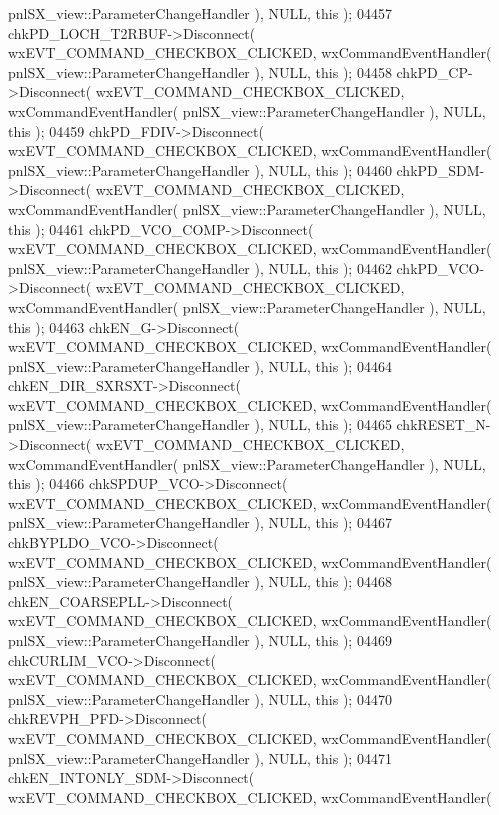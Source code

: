 \begin{DoxyCode}
      pnlSX_view::ParameterChangeHandler ), NULL, \textcolor{keyword}{this} );
04457     chkPD_LOCH_T2RBUF->Disconnect( wxEVT\_COMMAND\_CHECKBOX\_CLICKED, wxCommandEventHandler( 
      pnlSX_view::ParameterChangeHandler ), NULL, \textcolor{keyword}{this} );
04458     chkPD_CP->Disconnect( wxEVT\_COMMAND\_CHECKBOX\_CLICKED, wxCommandEventHandler( 
      pnlSX_view::ParameterChangeHandler ), NULL, \textcolor{keyword}{this} );
04459     chkPD_FDIV->Disconnect( wxEVT\_COMMAND\_CHECKBOX\_CLICKED, wxCommandEventHandler( 
      pnlSX_view::ParameterChangeHandler ), NULL, \textcolor{keyword}{this} );
04460     chkPD_SDM->Disconnect( wxEVT\_COMMAND\_CHECKBOX\_CLICKED, wxCommandEventHandler( 
      pnlSX_view::ParameterChangeHandler ), NULL, \textcolor{keyword}{this} );
04461     chkPD_VCO_COMP->Disconnect( wxEVT\_COMMAND\_CHECKBOX\_CLICKED, wxCommandEventHandler( 
      pnlSX_view::ParameterChangeHandler ), NULL, \textcolor{keyword}{this} );
04462     chkPD_VCO->Disconnect( wxEVT\_COMMAND\_CHECKBOX\_CLICKED, wxCommandEventHandler( 
      pnlSX_view::ParameterChangeHandler ), NULL, \textcolor{keyword}{this} );
04463     chkEN_G->Disconnect( wxEVT\_COMMAND\_CHECKBOX\_CLICKED, wxCommandEventHandler( 
      pnlSX_view::ParameterChangeHandler ), NULL, \textcolor{keyword}{this} );
04464     chkEN_DIR_SXRSXT->Disconnect( wxEVT\_COMMAND\_CHECKBOX\_CLICKED, wxCommandEventHandler( 
      pnlSX_view::ParameterChangeHandler ), NULL, \textcolor{keyword}{this} );
04465     chkRESET_N->Disconnect( wxEVT\_COMMAND\_CHECKBOX\_CLICKED, wxCommandEventHandler( 
      pnlSX_view::ParameterChangeHandler ), NULL, \textcolor{keyword}{this} );
04466     chkSPDUP_VCO->Disconnect( wxEVT\_COMMAND\_CHECKBOX\_CLICKED, wxCommandEventHandler( 
      pnlSX_view::ParameterChangeHandler ), NULL, \textcolor{keyword}{this} );
04467     chkBYPLDO_VCO->Disconnect( wxEVT\_COMMAND\_CHECKBOX\_CLICKED, wxCommandEventHandler( 
      pnlSX_view::ParameterChangeHandler ), NULL, \textcolor{keyword}{this} );
04468     chkEN_COARSEPLL->Disconnect( wxEVT\_COMMAND\_CHECKBOX\_CLICKED, wxCommandEventHandler( 
      pnlSX_view::ParameterChangeHandler ), NULL, \textcolor{keyword}{this} );
04469     chkCURLIM_VCO->Disconnect( wxEVT\_COMMAND\_CHECKBOX\_CLICKED, wxCommandEventHandler( 
      pnlSX_view::ParameterChangeHandler ), NULL, \textcolor{keyword}{this} );
04470     chkREVPH_PFD->Disconnect( wxEVT\_COMMAND\_CHECKBOX\_CLICKED, wxCommandEventHandler( 
      pnlSX_view::ParameterChangeHandler ), NULL, \textcolor{keyword}{this} );
04471     chkEN_INTONLY_SDM->Disconnect( wxEVT\_COMMAND\_CHECKBOX\_CLICKED, wxCommandEventHandler( 

\end{DoxyCode}
